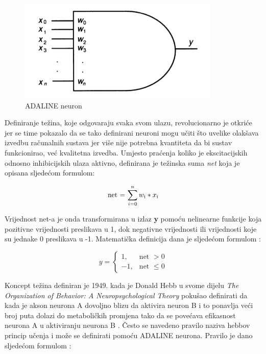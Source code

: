 \documentclass[times, utf8, zavrsni]{fer}
\begin{document}
\begin{figure}[H]
    \centering
    \includegraphics{img/adaline-neuron.png}
    \caption[Caption for LOF]{ADALINE neuron\footnotemark}
    \label{fig:adaline-neuron}
\end{figure}

Definiranje težina, koje odgovaraju svaka svom ulazu, revolucionarno je otkriće jer se time pokazalo da se tako definirani neuroni mogu učiti što uvelike olakšava izvedbu računalnih sustava jer više nije potrebna kvantiteta da bi sustav funkcionirao, već kvalitetna izvedba. Umjesto praćenja koliko je ekscitacijskih odnosno inhibicijskih ulaza aktivno, definirana je težinska suma \textit{net} koja je opisana sljedećom formulom:

\begin{equation}
    \label{net:eq}
    \text{net = $\sum\limits_{i=0}^n w\textsubscript{i} * x\textsubscript{i}$}
\end{equation}

Vrijednost net-a je onda transformirana u izlaz \textbf{y} pomoću nelinearne funkcije koja pozitivne vrijednosti preslikava u 1, dok negativne vrijednosti ili vrijednosti koje su jednake 0 preslikava u -1. Matematička definicija dana je sljedećom formulom \citep{picton2000}:

\begin{equation}
\label{step:eq}
    y = 
    \begin{cases}
        1, & \text{net $>0$} \\
        -1, & \text{net $\leq 0$}
    \end{cases}
\end{equation}

\bigskip

Koncept težina definiran je 1949. kada je Donald Hebb u svome dijelu \textit{The Organization of Behavior: A Neuropsychological Theory} pokušao definirati da kada je akson neurona A dovoljno blizu da aktivira neuron B i to ponavlja veći broj puta dolazi do metaboličkih promjena tako da se povećava efikasnost neurona A u aktiviranju neurona B \citep{hebb}. Često se navedeno pravilo naziva hebbov princip učenja i može se definirati pomoću ADALINE neurona. Pravilo je dano sljedećom formulom \citep{picton2000}:
\end{document}
